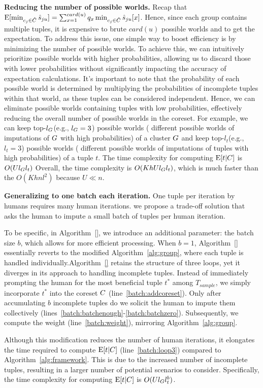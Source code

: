 \noindent \textbf{Reducing the number of possible worlds.} Recap that $\mathrm{E}[\min_{c_j\in \hat {C}}\hat{s}_{ju}] = \sum_{x=1}^{card(u)} q_x \min_{c_j \in \hat{C}} \hat{s}_{ju}[x]$.
%
 Hence, since each group contains multiple tuples, it is expensive to brute $card(u)$ possible worlds and  to get the expectation. To address this issue, one simple way to boost efficiency is by minimizing the number of possible worlds. To achieve this, we can intuitively prioritize possible worlds with higher probabilities, allowing us to discard those with lower probabilities without significantly impacting the accuracy of expectation calculations. It's important to note that the probability of each possible world is determined by multiplying the probabilities of incomplete tuples within that world, as these tuples can be considered independent. Hence, we can eliminate possible worlds containing tuples with low probabilities, effectively reducing the overall number of possible worlds in the coreset. For example, we can keep top-$l_G$(e.g., $l_G = 3$) possible worlds ( different possible worlds of imputations of $G$ with high probabilities) of a cluster $G$ and keep top-$l_t$(e.g., $l_t = 3$) possible worlds ( different possible worlds of imputations of tuples with high probabilities) of a tuple $t$. The time complexity for computing $\mathrm{E}[t|C]$ is $O(Ul_{G}l_t)$ Overall, the time complexity is $O(KhUl_{G}l_t)$, which is much faster than the $O(Khnl^2)$ because $U \ll n$.

\noindent \textbf{Generalizing to one batch each iteration.}
One tuple per iteration by humans  requires many human iterations.  we propose a trade-off solution that asks the human to impute a small batch of tuples per human iteration.


To be specific, in Algorithm~\ref{}, we introduce an additional parameter: the batch size $b$, which allows for more efficient processing. When $b=1$, Algorithm~\ref{} essentially reverts to the modified Algorithm~\ref{alg:group}, where each tuple is handled individually.Algorithm~\ref{} retains the structure of three loops, yet it diverges in its approach to handling incomplete tuples. Instead of immediately prompting the human for the most beneficial tuple $t^*$ among $T_{sample}$, we simply incorporate $t^*$ into the coreset $C$ (line~\ref{batch:addcoreset}). Only after accumulating $b$ incomplete tuples do we solicit the human to impute them collectively (lines~\ref{batch:batchenough}-\ref{batch:batchzero}). Subsequently, we compute the weight (line~\ref{batch:weight}), mirroring Algorithm~\ref{alg:group}.

Although this modification reduces the number of human iterations, it elongates the time required to compute $\mathrm{E}[t|C]$ (line~\ref{batch:loop3}) compared to Algorithm~\ref{alg:framework}. This is due to the increased number of incomplete tuples, resulting in a larger number of potential scenarios to consider. Specifically, the time complexity for computing $\mathrm{E}[t|C]$ is $O(Ul_{G}l_t^b)$.